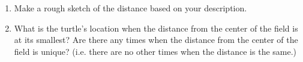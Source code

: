 \begin{enumerate}
\begin{enumerate}
    \vfill

  \item Make a rough sketch of the distance based on your
    description. 

    \vfill
    \vfill

  \item What is the turtle's location when the distance from the
    center of the field is at its smallest? Are there any times when
    the distance from the center of the field is unique? (i.e. there
    are no other times when the distance is the same.)

    \vfill
    
  \end{enumerate}



\end{enumerate}





